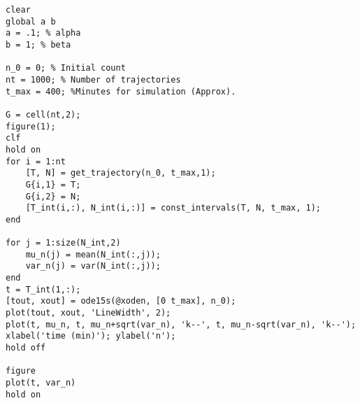
    \begin{verbatim}
clear
global a b
a = .1; % alpha
b = 1; % beta

n_0 = 0; % Initial count
nt = 1000; % Number of trajectories
t_max = 400; %Minutes for simulation (Approx).

G = cell(nt,2);
figure(1);
clf
hold on
for i = 1:nt
    [T, N] = get_trajectory(n_0, t_max,1);
    G{i,1} = T;
    G{i,2} = N;
    [T_int(i,:), N_int(i,:)] = const_intervals(T, N, t_max, 1);
end

for j = 1:size(N_int,2)
    mu_n(j) = mean(N_int(:,j));
    var_n(j) = var(N_int(:,j));
end
t = T_int(1,:);
[tout, xout] = ode15s(@xoden, [0 t_max], n_0);
plot(tout, xout, 'LineWidth', 2);
plot(t, mu_n, t, mu_n+sqrt(var_n), 'k--', t, mu_n-sqrt(var_n), 'k--');
xlabel('time (min)'); ylabel('n');
hold off

figure
plot(t, var_n)
hold on
\end{verbatim}
